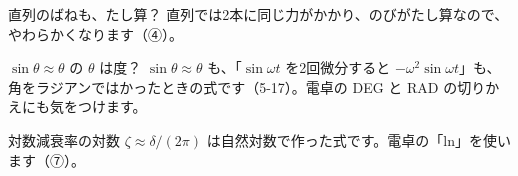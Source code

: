 \begin{tsumazuki}{直列のばねも、たし算？}
直列では2本に同じ力がかかり、のびがたし算なので、やわらかくなります（④）。
\end{tsumazuki}

\begin{tsumazuki}{$\sin\theta\approx\theta$ の $\theta$ は度？}
$\sin\theta\approx\theta$ も、「$\sin\omega t$ を2回微分すると $-\omega^2\sin\omega t$」も、角をラジアンではかったときの式です（5-17）。電卓の DEG と RAD の切りかえにも気をつけます。
\end{tsumazuki}

\begin{tsumazuki}{対数減衰率の対数}
$\zeta\approx\delta/(2\pi)$ は自然対数で作った式です。電卓の「ln」を使います（⑦）。
\end{tsumazuki}

